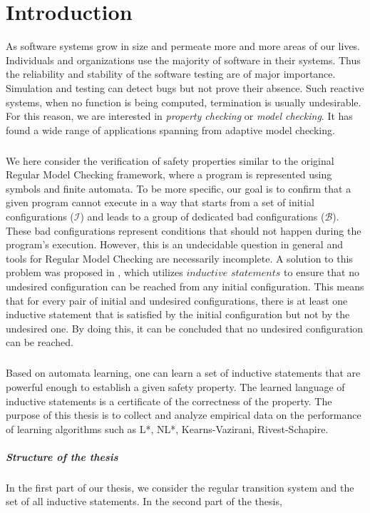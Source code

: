 
\chapter{Introduction}\label{chapter:introduction}
As software systems grow in size and permeate more and more areas of our lives.
Individuals and organizations use the majority of software in their systems. Thus the 
reliability and stability of the software testing are of major importance. Simulation 
and testing can detect bugs but not prove their absence. Such reactive 
systems, when no function is being computed, termination is usually undesirable. For 
this reason, we are interested in \textit{property checking} or \textit{model checking}. 
It has found a wide range of applications spanning from adaptive model checking.
\paragraph*{}
We here consider the verification of safety properties similar to the original 
Regular Model Checking framework, where a program is represented using symbols 
and finite automata.
To be more specific, our goal is to confirm that a given program cannot execute 
in a way that starts from a set of initial configurations ($\mathcal{I}$) and leads to a group 
of dedicated bad configurations ($\mathcal{B}$). These bad configurations represent conditions 
that should not happen during the program's execution. However, this is an 
undecidable question in general and tools for Regular Model Checking are 
necessarily incomplete. 
A solution to this problem was proposed in \cite*{clarke2009model}, which utilizes 
$\textit{inductive statements}$ to ensure that no undesired configuration can be reached 
from any initial configuration. This means that for every pair of initial 
and undesired configurations, there is at least one inductive statement that 
is satisfied by the initial configuration but not by the undesired one. 
By doing this, it can be concluded that no undesired configuration can be reached.
\paragraph*{}
Based on automata learning, one can learn a set of inductive statements that are powerful 
enough to establish a given safety property.
The learned language of inductive statements is a certificate of the correctness of the 
property. The purpose of this thesis is to collect and analyze empirical data on 
the performance of learning algorithms such as L*, NL*, Kearns-Vazirani, Rivest-Schapire.


\paragraph*{Structure of the thesis}
\paragraph*{}

In the first part of our thesis, we consider the regular transition system and 
the set of all inductive statements. In the second part of the thesis,